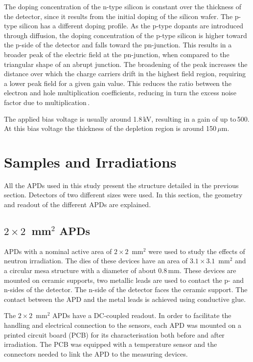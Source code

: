 \documentclass[3p,preprint,twocolumn]{elsarticle}
\begin{document}
The doping concentration of the n-type silicon is constant over the thickness of the detector, since it results from the initial doping of the silicon wafer.
The p-type silicon has a different doping profile.
As the p-type dopants are introduced through diffusion, the doping concentration of the p-type silicon is higher toward the p-side of the detector and falls toward the pn-junction.
This results in a broader peak of the electric field at the pn-junction, when compared to the triangular shape of an abrupt junction.
The broadening of the peak increases the distance over which the charge carriers drift in the highest field region, requiring a lower peak field for a given gain value.
This reduces the ratio between the electron and hole multiplication coefficients, reducing in turn the excess noise factor due to multiplication\,\cite{theoryDDAPD}.

The applied bias voltage is usually around 1.8\,kV, resulting in a gain of up to\,500.
At this bias voltage the thickness of the depletion region is around 150\,$\mu$m.


\section{Samples and Irradiations}
\label{sec:samples}

All the APDs used in this study present the structure detailed in the previous section.
Detectors of two different sizes were used.
In this section, the geometry and readout of the different APDs are explained.

\subsection{$2 \times 2$~mm$^2$ APDs}

APDs with a nominal active area of $2 \times 2$~mm$^2$ were used to study the effects of neutron irradiation.
The dies of these devices have an area of $3.1 \times 3.1$~mm$^2$ and a circular mesa structure with a diameter of about 0.8\,mm.
These devices are mounted on ceramic supports, two metallic leads are used to contact the p- and n-sides of the detector.
The n-side of the detector faces the ceramic support.
The contact between the APD and the metal leads is achieved using conductive glue.

The $2 \times 2$~mm$^2$ APDs have a DC-coupled readout.
In order to facilitate the handling and electrical connection to the sensors, each APD was mounted on a printed circuit board (PCB) for its characterisation both before and after irradiation.
The PCB was equipped with a temperature sensor and the connectors needed to link the APD to the measuring devices.
\end{document}
